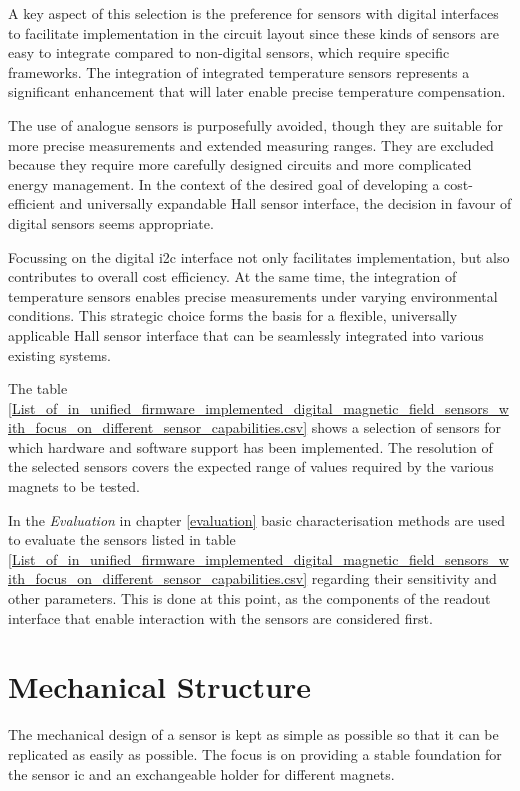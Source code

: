 A key aspect of this selection is the preference for sensors with
digital interfaces to facilitate implementation in the circuit layout
since these kinds of sensors are easy to integrate compared to
non-digital sensors, which require specific frameworks. The integration
of integrated temperature sensors represents a significant enhancement
that will later enable precise temperature compensation.

The use of analogue sensors is purposefully avoided, though they are
suitable for more precise measurements and extended measuring ranges.
They are excluded because they require more carefully designed circuits
and more complicated energy management. In the context of the desired
goal of developing a cost-efficient and universally expandable Hall
sensor interface, the decision in favour of digital sensors seems
appropriate.

\newpage

Focussing on the digital \gls{i2c} interface not only facilitates
implementation, but also contributes to overall cost efficiency. At the
same time, the integration of temperature sensors enables precise
measurements under varying environmental conditions. This strategic
choice forms the basis for a flexible, universally applicable Hall
sensor interface that can be seamlessly integrated into various existing
systems.

The table
\ref{List_of_in_unified_firmware_implemented_digital_magnetic_field_sensors_with_focus_on_different_sensor_capabilities.csv}
shows a selection of sensors for which hardware and software support has
been implemented. The resolution of the selected sensors covers the
expected range of values required by the various magnets to be tested.

In the \emph{Evaluation} in chapter \ref{evaluation} basic
characterisation methods are used to evaluate the sensors listed in
table
\ref{List_of_in_unified_firmware_implemented_digital_magnetic_field_sensors_with_focus_on_different_sensor_capabilities.csv}
regarding their sensitivity and other parameters. This is done at this
point, as the components of the readout interface that enable
interaction with the sensors are considered first.

\hypertarget{mechanical-structure}{%
\section{Mechanical Structure}\label{mechanical-structure}}

The mechanical design of a sensor is kept as simple as possible so that
it can be replicated as easily as possible. The focus is on providing a
stable foundation for the sensor \gls{ic} and an exchangeable holder for
different magnets.

